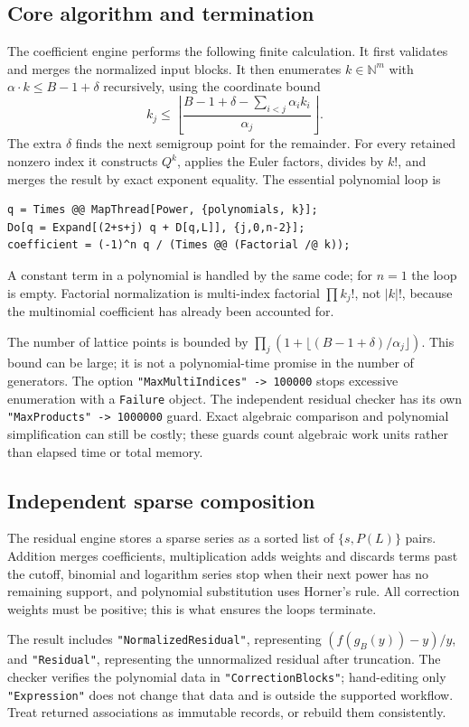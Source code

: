 \documentclass[11pt,a4paper]{article}
\newcommand{\N}{\mathbb N}
\theoremstyle{definition}
\begin{document}
\subsection{Core algorithm and termination}
The coefficient engine performs the following finite calculation. It first
validates and merges the normalized input blocks. It then enumerates
\(k\in\N^m\) with \(\alpha\cdot k\le B-1+\delta\) recursively, using the
coordinate bound
\[
 k_j\le\left\lfloor
 \frac{B-1+\delta-\sum_{i<j}\alpha_i k_i}{\alpha_j}
 \right\rfloor.
\]
The extra \(\delta\) finds the next semigroup point for the remainder.
For every retained nonzero index it constructs \(Q^k\), applies the Euler
factors, divides by \(k!\), and merges the result by exact exponent equality.
The essential polynomial loop is
\begin{lstlisting}
q = Times @@ MapThread[Power, {polynomials, k}];
Do[q = Expand[(2+s+j) q + D[q,L]], {j,0,n-2}];
coefficient = (-1)^n q / (Times @@ (Factorial /@ k));
\end{lstlisting}
A constant term in a polynomial is handled by the same code; for \(n=1\)
the loop is empty. Factorial normalization is multi-index factorial
\(\prod k_j!\), not \(|k|!\), because the multinomial coefficient has already
been accounted for.

The number of lattice points is bounded by
\(\prod_j(1+\lfloor(B-1+\delta)/\alpha_j\rfloor)\). This bound can be large;
it is not a polynomial-time promise in the number of generators. The option
\texttt{"MaxMultiIndices" -> 100000} stops excessive enumeration with a
\texttt{Failure} object. The independent residual checker has its own
\texttt{"MaxProducts" -> 1000000} guard. Exact algebraic comparison and
polynomial simplification can still be costly; these guards count algebraic
work units rather than elapsed time or total memory.

\subsection{Independent sparse composition}
The residual engine stores a sparse series as a sorted list of
\(\{s,P(L)\}\) pairs. Addition merges coefficients, multiplication adds
weights and discards terms past the cutoff, binomial and logarithm series
stop when their next power has no remaining support, and polynomial
substitution uses Horner's rule. All correction weights must be positive;
this is what ensures the loops terminate.

The result includes \texttt{"NormalizedResidual"}, representing
\((f(g_B(y))-y)/y\), and \texttt{"Residual"}, representing the unnormalized
residual after truncation. The checker verifies the polynomial data in
\texttt{"CorrectionBlocks"}; hand-editing only \texttt{"Expression"} does
not change that data and is outside the supported workflow. Treat returned
associations as immutable records, or rebuild them consistently.
\end{document}
